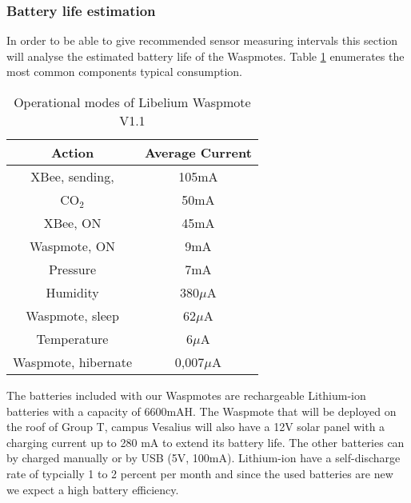 \subsubsection{Battery life estimation}
In order to be able to give recommended sensor measuring intervals this section will analyse the estimated battery life of the Waspmotes. Table \ref{tab:cons2} enumerates the most common components typical consumption.
\begin{table}[!ht]
\begin{center}
\begin{tabular}[!ht]{|c|c|}
\hline
\textbf{Action} & \textbf{Average Current}\\
\hline
XBee, sending, & 105mA\\
\hline
CO$_{2}$ & 50mA\\
\hline
XBee, ON & 45mA\\
\hline
Waspmote, ON & 9mA\\
\hline
Pressure & 7mA\\
\hline
Humidity & 380$\mu$A\\
\hline
Waspmote, sleep & 62$\mu$A\\
\hline
Temperature & 6$\mu$A\\
\hline
Waspmote, hibernate & 0,007$\mu$A\\
\hline
\end{tabular}
\caption{Operational modes of Libelium Waspmote V1.1}
\label{tab:cons2}
\end{center}
\end{table}
The batteries included with our Waspmotes are rechargeable Lithium-ion batteries with a capacity of 6600mAH. The Waspmote that will be deployed on the roof of Group T, campus Vesalius will also have a 12V solar panel with a charging current up to 280 mA to extend its battery life. The other batteries can by charged manually or by USB (5V, 100mA). Lithium-ion have a self-discharge rate of typcially 1 to 2 percent per month \citep{LION} and since the used batteries are new we expect a high battery efficiency.\\
